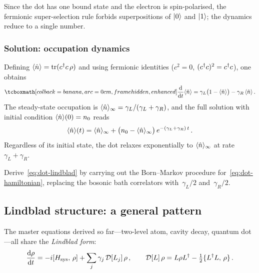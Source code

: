 \begin{remark}
  Since the dot has one bound state and the electron is spin-polarised,
  the fermionic super-selection rule forbids superpositions of
  $\lvert 0 \rangle$ and $\lvert 1 \rangle$; the dynamics reduce to a single number.
\end{remark}

\subsubsection{Solution: occupation dynamics}

Defining $\langle \hat{n} \rangle = \operatorname{tr}(c^\dagger c\,\rho)$ and using
fermionic identities ($c^2 = 0$, $(c^\dagger c)^2 = c^\dagger c$), one
obtains
\begin{equation}\label{eq:occupation-ode}
  \eqbox{\frac{\dd}{\dd t}\expect{\hat{n}}
  = \gamma_L\bigl(1 - \expect{\hat{n}}\bigr)
    - \gamma_R\,\expect{\hat{n}}}\,.
\end{equation}
The steady-state occupation is
$\langle \hat{n} \rangle_\infty = \gamma_L / (\gamma_L + \gamma_R)$,
and the full solution with initial condition
$\langle \hat{n} \rangle(0) = n_0$ reads
\begin{equation}\label{eq:n-solution}
  \langle \hat{n} \rangle(t)
  = \langle \hat{n} \rangle_\infty
    + \bigl(n_0 - \langle \hat{n} \rangle_\infty\bigr)\,
      e^{-(\gamma_L + \gamma_R)\,t}\,.
\end{equation}
Regardless of its initial state, the dot relaxes exponentially to
$\langle \hat{n} \rangle_\infty$ at rate $\gamma_L + \gamma_R$.

\begin{exercise}\label{ex:derive-dot-lindblad}
  Derive~\eqref{eq:dot-lindblad} by carrying out the Born--Markov
  procedure for~\eqref{eq:dot-hamiltonian}, replacing the bosonic bath
  correlators with~$\gamma_L/2$ and~$\gamma_R/2$.
\end{exercise}

\subsection{Lindblad structure: a general pattern}%
\label{sec:lindblad-pattern}

The master equations derived so far---two-level atom, cavity decay,
quantum dot---all share the \emph{Lindblad form}:
\begin{equation}\label{eq:generic-lindblad}
  \frac{\mathrm{d}\rho}{\mathrm{d} t}
  = -i[H_{\mathrm{sys}},\,\rho]
    + \sum_j \gamma_j\,\mathcal{D}[L_j]\,\rho\,,
  \qquad
  \mathcal{D}[L]\,\rho
  = L\rho L^\dagger
    - \tfrac{1}{2}\{L^\dagger L,\,\rho\}\,.
\end{equation}

